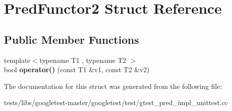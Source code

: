 \hypertarget{structPredFunctor2}{}\section{Pred\+Functor2 Struct Reference}
\label{structPredFunctor2}
\subsection*{Public Member Functions}
\begin{DoxyCompactItemize}
\item 
\mbox{\label{structPredFunctor2_a2142c86e4c0a3139e167dd3f13eb7f6f}} 
{\footnotesize template$<$typename T1 , typename T2 $>$ }\\bool {\bfseries operator()} (const T1 \&v1, const T2 \&v2)
\end{DoxyCompactItemize}


The documentation for this struct was generated from the following file\+:\begin{DoxyCompactItemize}
\item 
tests/libs/googletest-\/master/googletest/test/gtest\+\_\+pred\+\_\+impl\+\_\+unittest.\+cc\end{DoxyCompactItemize}
